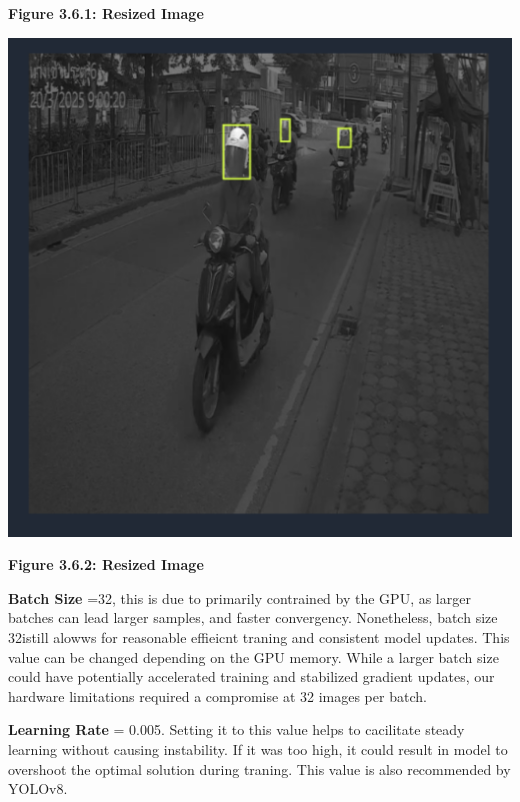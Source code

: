 \begin{center}
\begin{minipage}{0.45\textwidth}
		\textbf{Figure 3.6.1: Resized Image }
	\end{minipage}
	\hfill
	\begin{minipage}{0.45\textwidth}
		\centering
		\includegraphics[width=\linewidth]{ano2.png}
		\vspace{0.5em}
		
		\textbf{Figure 3.6.2: Resized Image }
	\end{minipage}
\end{center}




\textbf{Batch Size} =32, this is due to primarily contrained by the GPU, as larger batches can lead larger samples, and faster convergency. Nonetheless, batch size 32istill alowws for reasonable effieicnt traning and consistent model updates. This value can be changed depending on the GPU memory. While a larger batch size could have potentially accelerated training and stabilized gradient updates, our hardware limitations required a compromise at 32 images per batch.

\textbf{Learning Rate} = 0.005. Setting it to this value helps to cacilitate steady learning without causing instability. If it was too high, it could result in model to overshoot the optimal solution during traning. This value is also recommended by YOLOv8.



